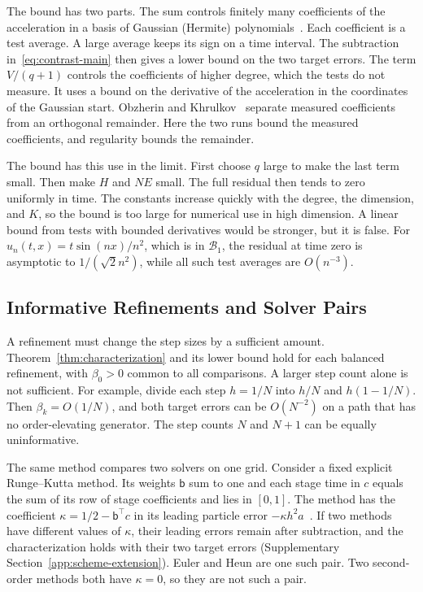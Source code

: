 The bound has two parts. The sum controls finitely many coefficients of
the acceleration in a basis of Gaussian (Hermite)
polynomials~\citep{bogachev1998gaussian}. Each coefficient is a test
average. A large average keeps its sign on a time interval. The
subtraction in~\eqref{eq:contrast-main} then gives a lower bound on the
two target errors. The term $V/(q+1)$ controls the
coefficients of higher degree, which the tests do not measure. It uses a
bound on the derivative of the acceleration in the coordinates of the
Gaussian start. Obzherin and Khrulkov~\citep[Proposition~10]{obzherin2026finite}
separate measured coefficients from an orthogonal remainder. Here the
two runs bound the measured coefficients, and regularity bounds the
remainder.

The bound has this use in the limit. First choose $q$ large to make the
last term small. Then make $H$ and $NE$ small. The full residual then
tends to zero uniformly in time. The constants increase quickly with the
degree, the dimension, and $K$, so the bound is too large for numerical
use in high dimension. A linear bound from tests with bounded
derivatives would be stronger, but it is false. For
$u_n(t,x)=t\sin(nx)/n^2$, which is in $\mathcal B_1$, the residual at
time zero is asymptotic to $1/(\sqrt2n^2)$, while all such test averages
are $O(n^{-3})$.

\subsection{Informative Refinements and Solver Pairs}
A refinement must change the step sizes by a sufficient amount.
Theorem~\ref{thm:characterization} and its lower bound hold for each
balanced refinement, with $\beta_0>0$ common to all comparisons. A
larger step count alone is not sufficient. For example, divide
each step $h=1/N$ into $h/N$ and $h(1-1/N)$. Then $\beta_k=O(1/N)$,
and both target errors can be $O(N^{-2})$ on a path that has no
order-elevating generator. The step counts $N$ and $N+1$ can be equally uninformative.

The same method compares two solvers on one grid. Consider a fixed explicit Runge--Kutta method. Its weights $\mathsf b$
sum to one and each stage time in $c$ equals the sum of its row of stage
coefficients and lies in $[0,1]$. The method has the coefficient $\kappa=1/2-\mathsf b^\top c$ in its leading
particle error $-\kappa h^2a$~\citep{hairer1993solving}.
If two methods have different values of $\kappa$, their leading errors
remain after subtraction, and the characterization holds with their two
target errors (Supplementary Section~\ref{app:scheme-extension}). Euler
and Heun are one such pair. Two second-order methods both have
$\kappa=0$, so they are not such a pair.

